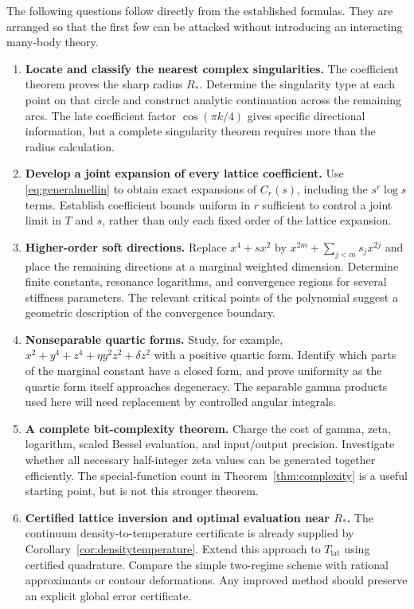 \documentclass[11pt,a4paper]{article}
\numberwithin{equation}{section}
\theoremstyle{definition}
\newcommand{\latt}{\mathrm{lat}}
\begin{document}
The following questions follow directly from the established formulas.
They are arranged so that the first few can be attacked without
introducing an interacting many-body theory.

\begin{enumerate}[label=\textbf{\arabic*.},leftmargin=*]
\item \textbf{Locate and classify the nearest complex singularities.}
The coefficient theorem proves the sharp radius $R_*$. Determine the
singularity type at each point on that circle and construct analytic
continuation across the remaining arcs. The late coefficient factor
$\cos(\pi k/4)$ gives specific directional information, but a complete
singularity theorem requires more than the radius calculation.

\item \textbf{Develop a joint expansion of every lattice coefficient.}
Use \eqref{eq:generalmellin} to obtain exact expansions of $C_r(s)$,
including the $s^r\log s$ terms. Establish coefficient bounds uniform
in $r$ sufficient to control a joint limit in $T$ and $s$, rather than
only each fixed order of the lattice expansion.

\item \textbf{Higher-order soft directions.}
Replace $x^4+s x^2$ by $x^{2m}+\sum_{j<m}s_jx^{2j}$ and place the
remaining directions at a marginal weighted dimension. Determine
finite constants, resonance logarithms, and convergence regions for
several stiffness parameters. The relevant critical points of the
polynomial suggest a geometric description of the convergence boundary.

\item \textbf{Nonseparable quartic forms.}
Study, for example, $x^2+y^4+z^4+\eta y^2z^2+\delta z^2$ with a
positive quartic form. Identify which parts of the marginal constant
have a closed form, and prove uniformity as the quartic form itself
approaches degeneracy. The separable gamma products used here will
need replacement by controlled angular integrals.

\item \textbf{A complete bit-complexity theorem.}
Charge the cost of gamma, zeta, logarithm, scaled Bessel evaluation,
and input/output precision. Investigate whether all necessary
half-integer zeta values can be generated together efficiently.
The special-function count in Theorem~\ref{thm:complexity} is a useful
starting point, but is not this stronger theorem.

\item \textbf{Certified lattice inversion and optimal evaluation near $R_*$.}
The continuum density-to-temperature certificate is already supplied
by Corollary~\ref{cor:densitytemperature}. Extend this approach to
$T_{\latt}$ using certified quadrature. Compare the simple two-regime scheme with
rational approximants or contour deformations. Any improved method
should preserve an explicit global error certificate.


\end{enumerate}
\end{document}
